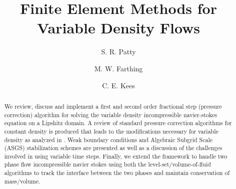 \documentclass[letterpaper]{erdc}
\begin{document}
\frontmatter


\title{Finite Element Methods for Variable Density Flows}

\author{S. R. Patty}

\author{M. W. Farthing \and C. E. Kees}

%
%




\begin{abstract}
  We review, discuss and implement a first and second order fractional step (pressure correction) algorithm for solving the variable density incompressible navier-stokes equation on a Lipshitz domain.  A review of standard pressure correction algorithms for constant density is produced that leads to the modifications necessary for variable density as analyzed in \cite{guermond2011error}.  Weak boundary conditions and Algebraic Subgrid Scale (ASGS) stabilization schemes are presented as well as a discussion of the challenges involved in using variable time steps. Finally, we extend the framework to handle two phase flow incompressible navier stokes using both the level-set/volume-of-fluid algorithms to track the interface between the two phases and maintain conservation of mass/volume.
\end{abstract}

\end{document}
